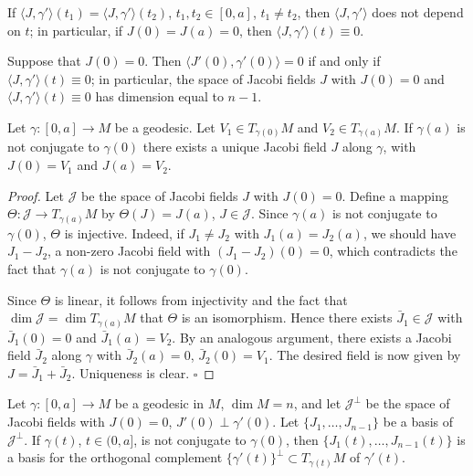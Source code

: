 \begin{corollary}[Corollary 3.7]
  \label{cor:dc-ch5-3-7}
  If $\langle J,\gamma'\rangle(t_1)=\langle J,\gamma'\rangle(t_2)$, $t_1,t_2\in[0,a]$,
  $t_1\neq t_2$, then $\langle J,\gamma'\rangle$ does not depend on $t$; in
  particular, if $J(0)=J(a)=0$, then $\langle J,\gamma'\rangle(t)\equiv 0$.
\end{corollary}

\begin{corollary}[Corollary 3.8]
  \label{cor:dc-ch5-3-8}
  Suppose that $J(0)=0$. Then $\langle J'(0),\gamma'(0)\rangle=0$ if and only if
  $\langle J,\gamma'\rangle(t)\equiv 0$; in particular, the space of Jacobi fields
  $J$ with $J(0)=0$ and $\langle J,\gamma'\rangle(t)\equiv 0$ has dimension equal to
  $n-1$.
\end{corollary}

\begin{proposition}[Proposition 3.9]
  \label{prop:dc-ch5-3-9}
  Let $\gamma:[0,a]\to M$ be a geodesic. Let $V_1\in T_{\gamma(0)}M$ and
  $V_2\in T_{\gamma(a)}M$. If $\gamma(a)$ is not conjugate to $\gamma(0)$ there
  exists a unique Jacobi field $J$ along $\gamma$, with $J(0)=V_1$ and $J(a)=V_2$.
\end{proposition}
\begin{proof}
  Let $\mathcal{J}$ be the space of Jacobi fields $J$ with $J(0)=0$. Define
  a mapping $\Theta:\mathcal{J}\to T_{\gamma(a)}M$ by $\Theta(J)=J(a)$,
  $J\in\mathcal{J}$. Since $\gamma(a)$ is not conjugate to $\gamma(0)$, $\Theta$ is
  injective. Indeed, if $J_1\neq J_2$ with $J_1(a)=J_2(a)$, we should have
  $J_1-J_2$, a non-zero Jacobi field with $(J_1-J_2)(0)=0$, which contradicts the
  fact that $\gamma(a)$ is not conjugate to $\gamma(0)$.
  
  Since $\Theta$ is linear, it follows from injectivity and the fact that
  $\dim\mathcal{J}=\dim T_{\gamma(a)}M$ that $\Theta$ is an isomorphism. Hence there
  exists $\bar J_1\in\mathcal{J}$ with $\bar J_1(0)=0$ and $\bar J_1(a)=V_2$. By an
  analogous argument, there exists a Jacobi field $\bar J_2$ along $\gamma$ with
  $\bar J_2(a)=0$, $\bar J_2(0)=V_1$. The desired field is now given by
  $J=\bar J_1+\bar J_2$. Uniqueness is clear. $\square$
\end{proof}

\begin{corollary}[Corollary 3.10]
  \label{cor:dc-ch5-3-10}
  Let $\gamma:[0,a]\to M$ be a geodesic in $M$, $\dim M=n$, and let
  $\mathcal{J}^\perp$ be the space of Jacobi fields with $J(0)=0$,
  $J'(0)\perp\gamma'(0)$. Let $\{J_1,\dots,J_{n-1}\}$ be a basis of
  $\mathcal{J}^\perp$. If $\gamma(t)$, $t\in(0,a]$, is not conjugate to $\gamma(0)$,
  then $\{J_1(t),\dots,J_{n-1}(t)\}$ is a basis for the orthogonal complement
  $\{\gamma'(t)\}^\perp\subset T_{\gamma(t)}M$ of $\gamma'(t)$.
\end{corollary}
